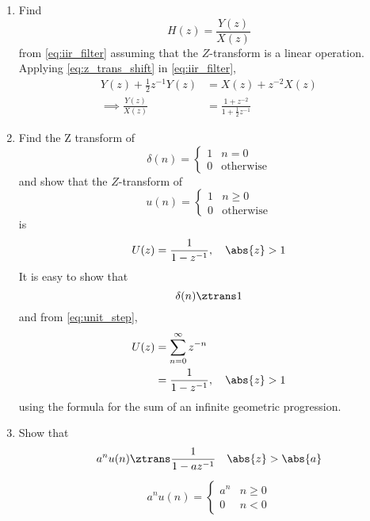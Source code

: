 \documentclass[journal,12pt,twocolumn]{IEEEtran}
\renewcommand\thesection{\arabic{section}}
\begin{document}
\begin{enumerate}[label=\thesection.\arabic*]
\item Find
%
\begin{equation}
H(z) = \frac{Y(z)}{X(z)}
\end{equation}
%
from  \eqref{eq:iir_filter} assuming that the $Z$-transform is a linear operation.
\\
\solution  Applying \eqref{eq:z_trans_shift} in \eqref{eq:iir_filter},
\begin{align}
Y(z) + \frac{1}{2}z^{-1}Y(z) &= X(z)+z^{-2}X(z)
\\
\implies \frac{Y(z)}{X(z)} &= \frac{1 + z^{-2}}{1 + \frac{1}{2}z^{-1}}
\label{eq:freq_resp}
\end{align}
%
\item Find the Z transform of 
\begin{equation}
\delta(n)
=
\begin{cases}
1 & n = 0
\\
0 & \text{otherwise}
\end{cases}
\end{equation}
and show that the $Z$-transform of
\begin{equation}
\label{eq:unit_step}
u(n)
=
\begin{cases}
1 & n \ge 0
\\
0 & \text{otherwise}
\end{cases}
\end{equation}
is
\begin{equation}
U(z) = \frac{1}{1-z^{-1}}, \quad \abs{z} > 1
\end{equation}
\solution It is easy to show that
\begin{equation}
\delta(n) \ztrans 1
\end{equation}
and from \eqref{eq:unit_step},
\begin{align}
U(z) &= \sum _{n= 0}^{\infty}z^{-n}
\\
&=\frac{1}{1-z^{-1}}, \quad \abs{z} > 1
\end{align}
using the formula for the sum of an infinite geometric progression.
%
\item Show that 
\begin{equation}
\label{eq:anun}
a^nu(n) \ztrans \frac{1}{1-az^{-1}} \quad \abs{z} > \abs{a}
\end{equation}
%
\solution \begin{align}
a^{n}u(n)=\begin{cases}
a^{n} & n\geq 0\\
0 & n <0
\end{cases}
\\

\end{align}
\end{enumerate}
\end{document}
